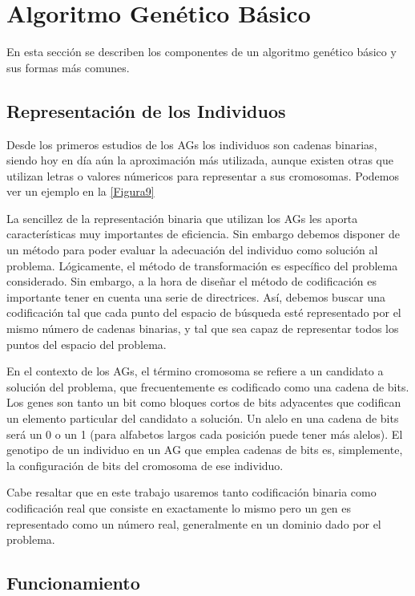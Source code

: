 \documentclass[runningheads]{llncs}
\begin{document}
\section{Algoritmo Genético Básico}

En esta sección se describen los componentes de un algoritmo genético básico y sus formas más comunes.

\subsection{Representación de los Individuos}

Desde los primeros estudios de los AGs los individuos son cadenas binarias, siendo hoy en día aún la aproximación
más utilizada, aunque existen otras que utilizan letras o valores númericos para representar a sus cromosomas. 
Podemos ver un ejemplo en la \ref{Figura9}


La sencillez de la representación binaria que utilizan los AGs les aporta características muy importantes de eficiencia. 
Sin embargo debemos disponer de un método para poder evaluar la adecuación del individuo como solución al 
problema. Lógicamente, el método de transformación es específico del problema considerado. Sin embargo, a la hora de diseñar
el método de codificación es importante tener en cuenta una serie de directrices. Así, debemos buscar una codificación tal que
cada punto del espacio de búsqueda esté representado por el mismo número de cadenas binarias, y tal que sea capaz de representar
todos los puntos del espacio del problema. 

En el contexto de los AGs, el término cromosoma se refiere a un candidato a solución del problema, que frecuentemente es 
codificado como una cadena de bits. Los genes son tanto un bit como bloques cortos de bits adyacentes 
que codifican un elemento particular del candidato a solución. Un alelo en una cadena de bits será 
un 0 o un 1 (para alfabetos largos cada posición puede tener más alelos). El genotipo de un individuo en un AG que emplea
cadenas de bits es, simplemente, la configuración de bits del cromosoma de ese individuo. 

Cabe resaltar que en este trabajo usaremos tanto codificación binaria como codificación real que
consiste en exactamente lo mismo pero un gen es representado como un número real, generalmente en un dominio dado por el 
problema. 


\subsection{Funcionamiento}
\end{document}
